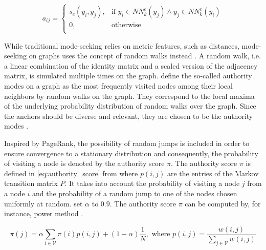 \begin{equation}
    a_{ij} = \begin{cases}
        s_e(y_i,y_j), & \text{if } y_i \in NN^e_k(y_j)\wedge y_j \in NN^e_k(y_i)\\
        0, & \text{otherwise}\\
      \end{cases}     
    \label{eq:mining_manifolds_adjacency_matrix}
\end{equation}



While traditional mode-seeking relies on metric features, such as distances, mode-seeking on graphs 
uses the concept of random walks instead \citet{mode_seeking_2012}.
A random walk, i.e. a linear combination of the identity matrix and a scaled version of the adjacency matrix, is simulated multiple times on the graph.
\citet{mode_seeking_2012} define the so-called authority modes on a graph as the most frequently visited nodes among their local neighbors 
by random walks on the graph.
They correspond to the local maxima of the underlying probability distribution of random walks over the graph.
Since the anchors should be diverse and relevant, they are chosen to be the authority modes \citet{mining_manifolds_2018}.

Inspired by PageRank, the possibility of random jumps is included in order to ensure convergence to a stationary distribution 
and consequently, the probability of visiting a node is denoted by the authority score $\pi$.
The authority score $\pi$ is defined in \eqref{eq:authority_score} from \citet{mode_seeking_2012} 
where $p(i,j)$ are the entries of the Markov transition matrix $P$.
It takes into account the probability of visiting a node $j$ from a node $i$ and 
the probability of a random jump to one of the nodes chosen uniformly at random.
\citet{mode_seeking_2012} set $\alpha$ to $0.9$. 
The authority score $\pi$ can be computed by, for instance, power method \citet{mode_seeking_2012,PageRank_2004}.

\begin{equation}
    \pi(j) = \alpha \sum_{i \in \mathcal{V}}^{}  \pi(i)p(i,j) + (1-\alpha)\frac{1}{N} , \text{ where } p(i,j) = \frac{w(i,j) }{\sum_{j \in \mathcal{V}}^{}w(i,j) } 
    \label{eq:authority_score}
\end{equation}

